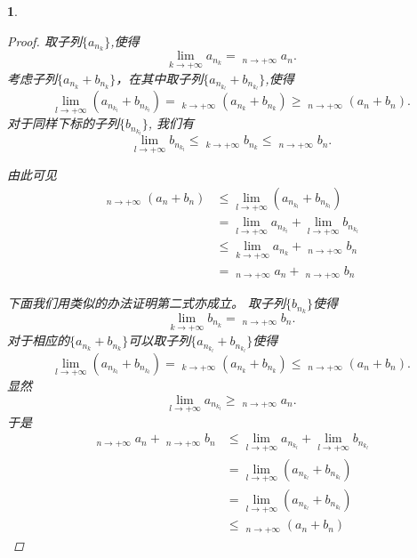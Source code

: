 \documentclass[utf8]{book}
\newtheorem{example}{}[section]             %
\DeclareMathOperator*\lowlim{\underline{lim}}
\DeclareMathOperator*\uplim{\overline{lim}}
\begin{document}
\begin{example}
\begin{enumerate}
\begin{proof}
取子列$\{a_{n_k}\}$,使得
$$\displaystyle\lim_{k\to +\infty}a_{n_k}=\displaystyle\lowlim_{n\to +\infty}a_n.$$
考虑子列$\{a_{n_k}+b_{n_k}\}$，在其中取子列$\{a_{n_{k_l}} + b_{n_{k_l}}\}$,使得
$$\displaystyle\lim_{l\to +\infty}(a_{n_{k_l}}+b_{n_{k_l}}) = \displaystyle\lowlim_{k\to +\infty}(a_{n_k} + b_{n_k}) \geq \displaystyle\lowlim_{n\to +\infty}(a_n + b_n).$$
对于同样下标的子列$\{b_{n_{k_l}}\}$, 我们有
$$\displaystyle\lim_{l\to +\infty}b_{n_{k_l}} \leq \displaystyle\uplim_{k\to +\infty}b_{n_k}\leq \displaystyle\uplim_{n\to +\infty}b_n.$$

由此可见
\begin{equation*}
\begin{split}
\displaystyle\lowlim_{n\to +\infty}(a_n + b_n) &\leq \displaystyle\lim_{l\to +\infty}(a_{n_{k_l}}+b_{n_{k_l}}) \\&= \displaystyle\lim_{l\to +\infty}a_{n_{k_l}}+\displaystyle\lim_{l\to +\infty}b_{n_{k_l}}\\&\leq \displaystyle\lim_{k\to +\infty}a_{n_k} + \displaystyle\uplim_{n\to +\infty}b_n\\&=\displaystyle\lowlim_{n\to +\infty}a_n+ \displaystyle\uplim_{n\to +\infty}b_n
\end{split}
\end{equation*}

下面我们用类似的办法证明第二式亦成立。
取子列$\{b_{n_k}\}$使得
$$\displaystyle\lim_{k\to +\infty}b_{n_k} = \displaystyle\uplim_{n\to +\infty}b_n.$$
对于相应的$\{a_{n_k}+b_{n_k}\}$可以取子列$\{a_{n_{k_l}}+b_{n_{k_l}}\}$使得
$$\displaystyle\lim_{l\to +\infty}(a_{n_{k_l}}+b_{n_{k_l}}) = \displaystyle\uplim_{k\to +\infty}(a_{n_k}+b_{n_k}) \leq   \displaystyle\uplim_{n\to +\infty}(a_n+b_n).$$
显然
$$\displaystyle\lim_{l\to +\infty}a_{n_{k_l}}\geq \displaystyle\lowlim_{n\to +\infty}a_n.$$
于是
\begin{equation*}
\begin{split}
\displaystyle\lowlim_{n\to +\infty}a_n+\displaystyle\uplim_{n\to +\infty}b_n &\leq \displaystyle\lim_{l\to +\infty}a_{n_{k_l}} + \displaystyle\lim_{l\to +\infty}b_{n_{k_l}}\\&=\displaystyle\lim_{l\to +\infty}(a_{n_{k_l}}+b_{n_{k_l}}) \\&=\displaystyle\lim_{l\to +\infty}(a_{n_{k_l}}+b_{n_{k_l}}) \\&\leq \displaystyle\uplim_{n\to +\infty}(a_n+b_n)
\end{split}
\end{equation*}


\end{proof}
\end{enumerate}
\end{example}
\end{document}

